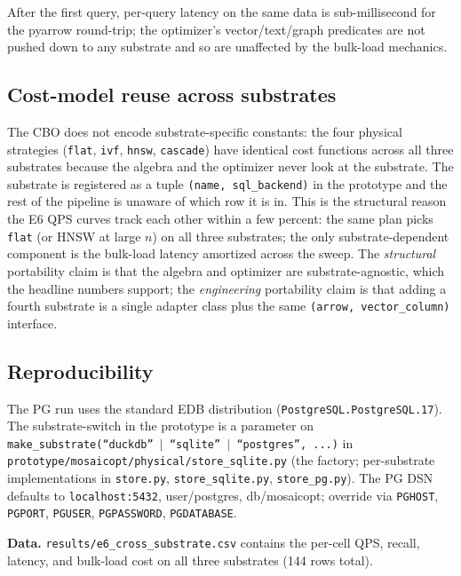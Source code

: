 \documentclass[sigconf]{acmart}
\theoremstyle{plain}
\theoremstyle{definition}
\theoremstyle{remark}
\begin{document}
After the first query, per-query latency on the same data is
sub-millisecond for the pyarrow round-trip; the optimizer's
vector/text/graph predicates are not pushed down to any
substrate and so are unaffected by the bulk-load mechanics.

\subsection*{Cost-model reuse across substrates}

The CBO does not encode substrate-specific constants: the four
physical strategies (\texttt{flat}, \texttt{ivf}, \texttt{hnsw},
\texttt{cascade}) have identical cost functions across all three
substrates because the algebra and the optimizer never look at
the substrate. The substrate is registered as a tuple
\texttt{(name, sql\_backend)} in the prototype and the rest of
the pipeline is unaware of which row it is in. This is the
structural reason the E6 QPS curves track each other within
a few percent: the same plan picks \texttt{flat} (or HNSW at
large $n$) on all three substrates; the only substrate-dependent
component is the bulk-load latency amortized across the sweep.
The \emph{structural} portability claim is that the algebra
and optimizer are substrate-agnostic, which the headline
numbers support; the \emph{engineering} portability claim is
that adding a fourth substrate is a single adapter class
plus the same \texttt{(arrow, vector\_column)} interface.

\subsection*{Reproducibility}

The PG run uses the standard EDB distribution
(\texttt{PostgreSQL.PostgreSQL.17}). The substrate-switch in
the prototype is a parameter on \texttt{make\_substrate(``duckdb''
$\mid$ ``sqlite'' $\mid$ ``postgres'', ...)} in
\texttt{prototype/mosaicopt/physical/store\_sqlite.py} (the
factory; per-substrate implementations in \texttt{store.py},
\texttt{store\_sqlite.py}, \texttt{store\_pg.py}). The PG
DSN defaults to \texttt{localhost:5432}, user/postgres,
db/mosaicopt; override via \texttt{PGHOST}, \texttt{PGPORT},
\texttt{PGUSER}, \texttt{PGPASSWORD}, \texttt{PGDATABASE}.

\noindent\textbf{Data.} \texttt{results/e6\_cross\_substrate.csv}
contains the per-cell QPS, recall, latency, and bulk-load cost
on all three substrates (144 rows total).
\end{document}

